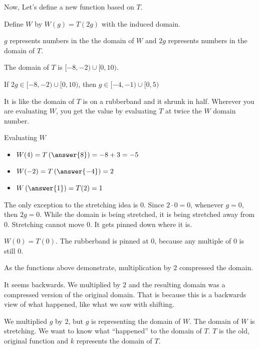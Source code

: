 \documentclass{ximera}
\begin{document}
Now, Let's define a new function based on $T$.



Define $W$ by $W(g) = T(2g)$ with the induced domain.



$g$ represents numbers in the the domain of $W$ and $2g$ represents numbers in the domain of $T$.  

The domain of $T$ is $[-8,-2) \cup [0,10)$.


If $2g \in [-8,-2) \cup [0,10)$, then $g \in [-4,-1) \cup [0,5)$

It is like the domain of $T$ is on a rubberband and it shrunk in half. Wherever you are evaluating $W$, you get the value by evaluating $T$ at twice the $W$ domain number.



\begin{example}  Evaluating $W$

\begin{itemize}
\item $W(4) = T\left(\answer{8}\right) = -8+3=-5$
\item $W(-2) = T\left(\answer{-4}\right) = 2$
\item $W\left(\answer{1}\right) = T(2) = 1$
\end{itemize}


\end{example}


The only exception to the stretching idea is $0$.  Since $2 \cdot 0 = 0$, whenever $g = 0$, then $2g = 0$.  While the domain is being stretched, it is being stretched away from $0$. Stretching cannot move $0$. It gets pinned down where it is.


$W(0) = T(0)$.  The rubberband is pinned at $0$, because any multiple of $0$ is still $0$.  

As the functions above demonstrate, multiplication by $2$ compressed the domain.

It seems backwards.  We multiplied by $2$ and the resulting domain was a compressed version of the original domain.  That is because this is a backwards view of what happened, like what we saw with shifting.



We multiplied $g$ by $2$, but $g$ is representing the domain of $W$.  The domain of $W$ is stretching.  We want to know what ``happened'' to the domain of $T$.  $T$ is the old, original function and $k$ represents the domain of $T$.  \\
\end{document}
